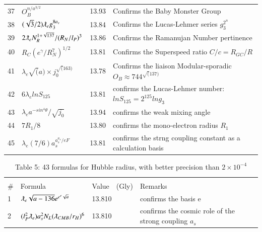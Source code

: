 \documentclass[a4paper,9pt]{article}
\begin{document}
\begin{appendix}
\begin{table}
\begin{tabular}{llll}
    
     37 & $O_B^{n/ a^{3/2}}$ & 13.93 & Confirms the Baby Monster Group\\
    
    
    
    38 & $(\sqrt{3}/2)\lambdabar_{e}g_3^{8a_s}$ & 13.84 & Confirms the Lucas-Lehmer series $g_ 3^{2^n}$\\
    39 & $2\lambdabar_{e} N_R^{1+\sqrt{137}}/(R_N/l_P)^3$ & 13.86 & Confirms the Ramanujan Number pertinence\\
    40 & $R_{C} (e^\gamma/R_N^7)^{1/2}$ & 13.81 & Confirms the Superspeed ratio $C/c = R_{GC}/R$\\
    41 & $\lambda_{e} \sqrt(a) \times j_0 ^{\sqrt(163)}$   & 13.78 & Confirms the  liaison Modular-sporadic $O_B \approx 744^{ \sqrt(137)}$ \\ 
    42 & $ 6\lambda_{e} lnS_{125} $   & 13.81 & confirms the Lucas-Lehmer number: $lnS_{125}  = 2^{125} lng_3 $ \\
    43 & $ \lambda_{e} a^{-sin^4\theta}/\sqrt {j_0}  $   & 13.94 & confirms the weak mixing angle \\
    
    44 & $7R_1/8  $   & 13.80 & confirms the mono-electron radius $R_1$ \\
    
    
    45 & $ \lambda_{e} (7/6) a_s^{a_s^{a_s}/eF}  $   & 13.81 & confirms the strng coupling constant as a calculation basis \\

    \bottomrule
  \end{tabular}
\end{table}


\begin{table}
\caption{Table 5: 43 formulas for Hubble radius, with better precision than $2 \times 10^{-4}$}
\label{tab:5:table5}
  \hskip-2.0cm\begin{tabular}{llll}
    \toprule
    \multicolumn{4}{c}{}                   \\
    \cmidrule(r){1-4}
   \#     & Formula     & Value~~(Gly) & Remarks \\
    \midrule    
    
   1 & $ \lambdabar_{e} \sqrt{a -136} e^{e^e \sqrt a}$ & 13.810 & confirms the basis e \\
  
   2 & $(l_P^2 \lambdabar_{e})a_s^2 N_L (\lambdabar_{CMB}/r_H)^6$ & 13.810 & confirms the cosmic role of the strong coupling $a_s$ \\
 

\end{tabular}
\end{table}
\end{appendix}
\end{document}
